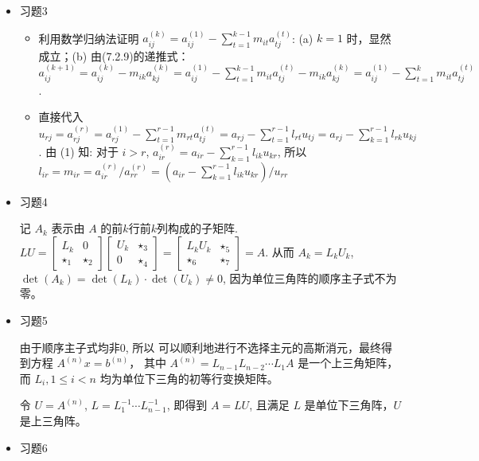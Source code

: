\documentclass{article}
\begin{document}
\begin{itemize}
    \item [3.] 习题3
    \begin{spacing}{1.25}
    \begin{itemize}
        \item [(1)] 利用数学归纳法证明 $a_{ij}^{(k)} = a_{ij}^{(1)} - \sum_{t=1}^{k-1} m_{it}a_{tj}^{(t)}$: (a) $k=1$ 时，显然成立；(b) 由(7.2.9)的递推式：
        $a_{ij}^{(k+1)} = a_{ij}^{(k)} - m_{ik}a_{kj}^{(k)} = a_{ij}^{(1)} - \sum_{t=1}^{k-1} m_{it}a_{tj}^{(t)} - m_{ik}a_{kj}^{(k)} = a_{ij}^{(1)} - \sum_{t=1}^{k} m_{it}a_{tj}^{(t)}$. 
        \item [(2)] 直接代入 $u_{rj} = a_{rj}^{(r)} = a_{rj}^{(1)} - \sum_{t=1}^{r-1} m_{rt}a_{tj}^{(t)} = a_{rj} - \sum_{t=1}^{r-1}l_{rt}u_{tj}= a_{rj} - \sum_{k=1}^{r-1}l_{rk}u_{kj}$.
        由 (1) 知: 对于 $i>r$, $a_{ir}^{(r)} = a_{ir} - \sum_{k=1}^{r-1} l_{ik} u_{kr}$, 所以 $l_{ir} = m_{ir} = a^{(r)}_{ir}/a^{(r)}_{rr} = (a_{ir} - \sum_{k=1}^{r-1} l_{ik} u_{kr}) / u_{rr}$
    \end{itemize}
    \end{spacing}

    \item [4.] 习题4
    
    记 $A_k$ 表示由 $A$ 的前$k$行前$k$列构成的子矩阵. $LU = \left[\begin{array}{cc}L_k&0\\\star_1&\star_2\end{array}\right] \left[\begin{array}{cc}U_k&\star_3\\0&\star_4\end{array}\right]
    =\left[\begin{array}{cc}L_kU_k&\star_5\\\star_6&\star_7\end{array}\right] = A$. 从而 $A_k = L_kU_k$, $\det(A_k) = \det(L_k)\cdot\det(U_k)\ne 0$, 因为单位三角阵的顺序主子式不为零。
~\\
    \item [5.] 习题5
    
    由于顺序主子式均非$0$, 所以 可以顺利地进行不选择主元的高斯消元，最终得到方程 $A^{(n)}x = b^{(n)}$， 其中 $A^{(n)} = L_{n-1}L_{n-2}\cdots L_1A$ 是一个上三角矩阵，而 $L_i, 1\leq i < n$ 均为单位下三角的初等行变换矩阵。
    
    令 $U = A^{(n)}$, $L = L_1^{-1}\cdots L_{n-1}^{-1}$, 即得到 $A = LU$, 且满足 $L$ 是单位下三角阵，$U$是上三角阵。

    \item [6.] 习题6
    \begin{spacing}{1.5}
    

\end{spacing}
\end{itemize}
\end{document}

